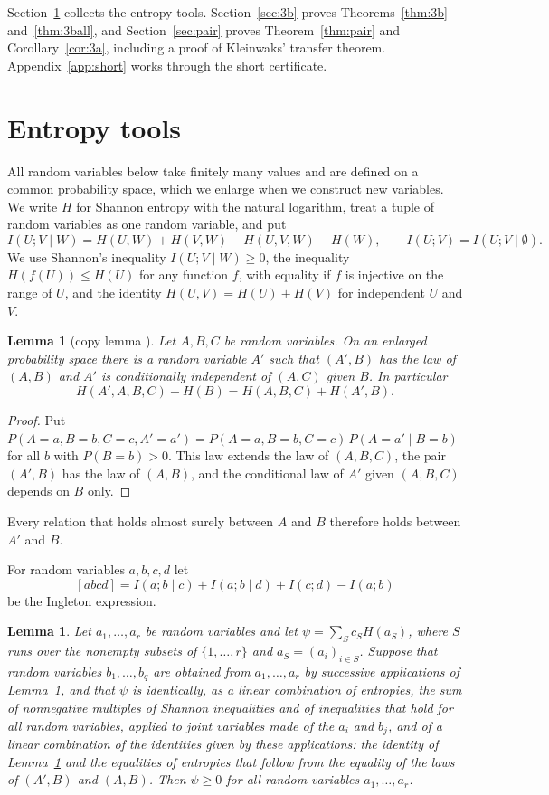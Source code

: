\documentclass[11pt]{amsart}
\newtheorem{lemma}[theorem]{Lemma}
\theoremstyle{definition}
\theoremstyle{remark}
\numberwithin{equation}{section}
\begin{document}
Section~\ref{sec:tools} collects the entropy tools. Section~\ref{sec:3b} proves Theorems~\ref{thm:3b} and~\ref{thm:3ball}, and Section~\ref{sec:pair} proves Theorem~\ref{thm:pair} and Corollary~\ref{cor:3a}, including a proof of Kleinwaks' transfer theorem. Appendix~\ref{app:short} works through the short certificate.

\section{Entropy tools}\label{sec:tools}

All random variables below take finitely many values and are defined on a common probability space, which we enlarge when we construct new variables. We write $H$ for Shannon entropy with the natural logarithm, treat a tuple of random variables as one random variable, and put
\[
I(U;V\mid W)=H(U,W)+H(V,W)-H(U,V,W)-H(W),\qquad I(U;V)=I(U;V\mid\emptyset).
\]
We use Shannon's inequality $I(U;V\mid W)\ge0$, the inequality $H(f(U))\le H(U)$ for any function $f$, with equality if $f$ is injective on the range of $U$, and the identity $H(U,V)=H(U)+H(V)$ for independent $U$ and $V$.

\begin{lemma}[copy lemma {\cite{ZY98,DFZ11}}]\label{lem:copy}
Let $A,B,C$ be random variables. On an enlarged probability space there is a random variable $A'$ such that $(A',B)$ has the law of $(A,B)$ and $A'$ is conditionally independent of $(A,C)$ given $B$. In particular
\[
H(A',A,B,C)+H(B)=H(A,B,C)+H(A',B).
\]
\end{lemma}

\begin{proof}
Put $P(A=a,B=b,C=c,A'=a')=P(A=a,B=b,C=c)\,P(A=a'\mid B=b)$ for all $b$ with $P(B=b)>0$. This law extends the law of $(A,B,C)$, the pair $(A',B)$ has the law of $(A,B)$, and the conditional law of $A'$ given $(A,B,C)$ depends on $B$ only.
\end{proof}

Every relation that holds almost surely between $A$ and $B$ therefore holds between $A'$ and $B$.

For random variables $a,b,c,d$ let
\[
[abcd]=I(a;b\mid c)+I(a;b\mid d)+I(c;d)-I(a;b)
\]
be the Ingleton expression.



\begin{lemma}\label{lem:copyineq}
Let $a_1,\dots,a_r$ be random variables and let $\psi=\sum_Sc_SH(a_S)$, where $S$ runs over the nonempty subsets of $\{1,\dots,r\}$ and $a_S=(a_i)_{i\in S}$. Suppose that random variables $b_1,\dots,b_q$ are obtained from $a_1,\dots,a_r$ by successive applications of Lemma~\ref{lem:copy}, and that $\psi$ is identically, as a linear combination of entropies, the sum of nonnegative multiples of Shannon inequalities and of inequalities that hold for all random variables, applied to joint variables made of the $a_i$ and $b_j$, and of a linear combination of the identities given by these applications: the identity of Lemma~\ref{lem:copy} and the equalities of entropies that follow from the equality of the laws of $(A',B)$ and $(A,B)$. Then $\psi\ge0$ for all random variables $a_1,\dots,a_r$.
\end{lemma}
\end{document}
